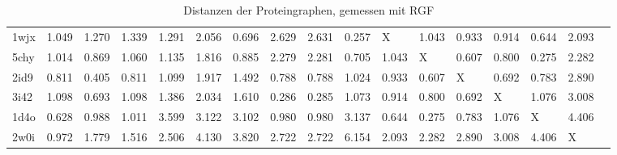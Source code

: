 \documentclass{report}
\begin{document}
\begin{table}
{\begin{tabular}{l l l l l l l l l l l l l l l l l}
1wjx & 1.049 & 1.270 & 1.339 & 1.291 & 2.056 & \cellcolor{fGreen!50}0.696 & 2.629 & 2.631 & \cellcolor{fGreen!100}0.257 &   X   & 1.043 & 0.933 & \cellcolor{fGreen!25}0.914 & \cellcolor{fGreen!75}0.644 & 2.093 &  \\
5chy & 1.014 & 0.869 & 1.060 & 1.135 & 1.816 & 0.885 & 2.279 & 2.281 & \cellcolor{fGreen!50}0.705 & 1.043 &   X   & \cellcolor{fGreen!75}0.607 & \cellcolor{fGreen!25}0.800 & \cellcolor{fGreen!100}0.275 & 2.282 &  \\
2id9 & 0.811 & \cellcolor{fGreen!100}0.405 & 0.811 & 1.099 & 1.917 & 1.492 & 0.788 & 0.788 & 1.024 & 0.933 & \cellcolor{fGreen!75}0.607 &   X   & \cellcolor{fGreen!50}0.692 & \cellcolor{fGreen!25}0.783 & 2.890 &  \\
3i42 & 1.098 & \cellcolor{fGreen!25}0.693 & 1.098 & 1.386 & 2.034 & 1.610 & \cellcolor{fGreen!75}0.286 & \cellcolor{fGreen!100}0.285 & 1.073 & 0.914 & 0.800 & \cellcolor{fGreen!50}0.692 &   X   & 1.076 & 3.008 &  \\
1d4o & \cellcolor{fGreen!75}0.628 & 0.988 & 1.011 & 3.599 & 3.122 & 3.102 & 0.980 & 0.980 & 3.137 & \cellcolor{fGreen!50}0.644 & \cellcolor{fGreen!100}0.275 & \cellcolor{fGreen!25}0.783 & 1.076 &   X   & 4.406 &  \\
2w0i & \cellcolor{fGreen!100}0.972 & \cellcolor{fGreen!50}1.779 & \cellcolor{fGreen!75}1.516 & 2.506 & 4.130 & 3.820 & 2.722 & 2.722 & 6.154 & \cellcolor{fGreen!25}2.093 & 2.282 & 2.890 & 3.008 & 4.406 &   X   &  \\


\end{tabular}}
\caption{Distanzen der Proteingraphen, gemessen mit RGF}
\end{table}
\end{document}
